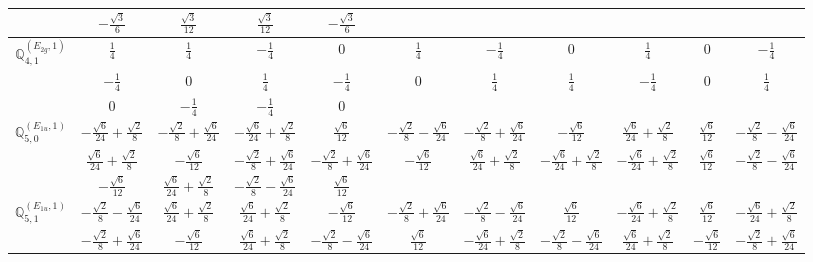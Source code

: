 \documentclass[fleqn,10pt,landscape]{article}
\begin{document}
\begin{itemize}
{\begin{center}
\begin{longtable}{ccccccccccc}
& $ - \frac{\sqrt{3}}{6} $ & $ \frac{\sqrt{3}}{12} $ & $ \frac{\sqrt{3}}{12} $ & $ - \frac{\sqrt{3}}{6} $ & $  $ & $  $ & $  $ & $  $ & $  $ & $  $ \\ \hline
$\mathbb{Q}_{4,1}^{(E_{2g},1)}$ & $ \frac{1}{4} $ & $ \frac{1}{4} $ & $ - \frac{1}{4} $ & $ 0 $ & $ \frac{1}{4} $ & $ - \frac{1}{4} $ & $ 0 $ & $ \frac{1}{4} $ & $ 0 $ & $ - \frac{1}{4} $ \\
& $ - \frac{1}{4} $ & $ 0 $ & $ \frac{1}{4} $ & $ - \frac{1}{4} $ & $ 0 $ & $ \frac{1}{4} $ & $ \frac{1}{4} $ & $ - \frac{1}{4} $ & $ 0 $ & $ \frac{1}{4} $ \\
& $ 0 $ & $ - \frac{1}{4} $ & $ - \frac{1}{4} $ & $ 0 $ & $  $ & $  $ & $  $ & $  $ & $  $ & $  $ \\ \hline
$\mathbb{Q}_{5,0}^{(E_{1u},1)}$ & $ - \frac{\sqrt{6}}{24} + \frac{\sqrt{2}}{8} $ & $ - \frac{\sqrt{2}}{8} + \frac{\sqrt{6}}{24} $ & $ - \frac{\sqrt{6}}{24} + \frac{\sqrt{2}}{8} $ & $ \frac{\sqrt{6}}{12} $ & $ - \frac{\sqrt{2}}{8} - \frac{\sqrt{6}}{24} $ & $ - \frac{\sqrt{2}}{8} + \frac{\sqrt{6}}{24} $ & $ - \frac{\sqrt{6}}{12} $ & $ \frac{\sqrt{6}}{24} + \frac{\sqrt{2}}{8} $ & $ \frac{\sqrt{6}}{12} $ & $ - \frac{\sqrt{2}}{8} - \frac{\sqrt{6}}{24} $ \\
& $ \frac{\sqrt{6}}{24} + \frac{\sqrt{2}}{8} $ & $ - \frac{\sqrt{6}}{12} $ & $ - \frac{\sqrt{2}}{8} + \frac{\sqrt{6}}{24} $ & $ - \frac{\sqrt{2}}{8} + \frac{\sqrt{6}}{24} $ & $ - \frac{\sqrt{6}}{12} $ & $ \frac{\sqrt{6}}{24} + \frac{\sqrt{2}}{8} $ & $ - \frac{\sqrt{6}}{24} + \frac{\sqrt{2}}{8} $ & $ - \frac{\sqrt{6}}{24} + \frac{\sqrt{2}}{8} $ & $ \frac{\sqrt{6}}{12} $ & $ - \frac{\sqrt{2}}{8} - \frac{\sqrt{6}}{24} $ \\
& $ - \frac{\sqrt{6}}{12} $ & $ \frac{\sqrt{6}}{24} + \frac{\sqrt{2}}{8} $ & $ - \frac{\sqrt{2}}{8} - \frac{\sqrt{6}}{24} $ & $ \frac{\sqrt{6}}{12} $ & $  $ & $  $ & $  $ & $  $ & $  $ & $  $ \\ \hline
$\mathbb{Q}_{5,1}^{(E_{1u},1)}$ & $ - \frac{\sqrt{2}}{8} - \frac{\sqrt{6}}{24} $ & $ \frac{\sqrt{6}}{24} + \frac{\sqrt{2}}{8} $ & $ \frac{\sqrt{6}}{24} + \frac{\sqrt{2}}{8} $ & $ - \frac{\sqrt{6}}{12} $ & $ - \frac{\sqrt{2}}{8} + \frac{\sqrt{6}}{24} $ & $ - \frac{\sqrt{2}}{8} - \frac{\sqrt{6}}{24} $ & $ \frac{\sqrt{6}}{12} $ & $ - \frac{\sqrt{6}}{24} + \frac{\sqrt{2}}{8} $ & $ \frac{\sqrt{6}}{12} $ & $ - \frac{\sqrt{6}}{24} + \frac{\sqrt{2}}{8} $ \\
& $ - \frac{\sqrt{2}}{8} + \frac{\sqrt{6}}{24} $ & $ - \frac{\sqrt{6}}{12} $ & $ \frac{\sqrt{6}}{24} + \frac{\sqrt{2}}{8} $ & $ - \frac{\sqrt{2}}{8} - \frac{\sqrt{6}}{24} $ & $ \frac{\sqrt{6}}{12} $ & $ - \frac{\sqrt{6}}{24} + \frac{\sqrt{2}}{8} $ & $ - \frac{\sqrt{2}}{8} - \frac{\sqrt{6}}{24} $ & $ \frac{\sqrt{6}}{24} + \frac{\sqrt{2}}{8} $ & $ - \frac{\sqrt{6}}{12} $ & $ - \frac{\sqrt{2}}{8} + \frac{\sqrt{6}}{24} $ \\

\end{longtable}
\end{center}}
\end{itemize}
\end{document}
